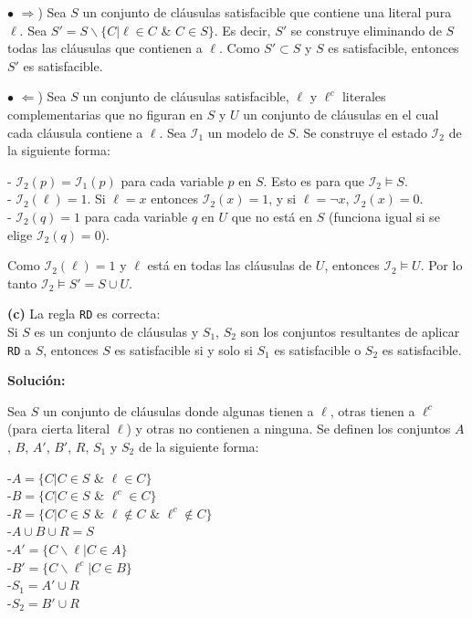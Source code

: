 \documentclass{article}
\begin{document}
\begin{itemize}
$\bullet$ $\Rightarrow$) Sea $S$ un conjunto de cláusulas satisfacible que contiene una literal pura $\ell$. Sea $S' = S \backslash \{ C | \ell \in C$ \& $C \in S \}$. Es decir, $S'$ se construye eliminando de $S$ todas las cláusulas que contienen a $\ell$. Como $S' \subset S$ y $S$ es satisfacible, entonces $S'$ es satisfacible.

$\bullet$ $\Leftarrow$) Sea $S$ un conjunto de cláusulas satisfacible, $\ell$ y $\ell^{c}$ literales complementarias que no figuran en $S$ y $U$ un conjunto de cláusulas en el cual cada cláusula contiene a $\ell$. Sea $\mathcal{I}_1$ un modelo de $S$. Se construye el estado $\mathcal{I}_2$ de la siguiente forma:

- $\mathcal{I}_2 (p) = \mathcal{I}_1 (p)$ para cada variable $p$ en $S$. Esto es para que $\mathcal{I}_2 \models S$.\\
- $\mathcal{I}_2 (\ell) = 1$. Si $\ell = x$ entonces $\mathcal{I}_2 (x) = 1$, y si $\ell = \neg x$, $\mathcal{I}_2(x) = 0$.\\
- $\mathcal{I}_2 (q) = 1$ para cada variable $q$ en $U$ que no está en $S$ (funciona igual si se elige $\mathcal{I}_2 (q) = 0$).

Como $\mathcal{I}_2 (\ell) = 1$ y $\ell$ está en todas las cláusulas de $U$, entonces $\mathcal{I}_2 \models U$. Por lo tanto $\mathcal{I}_2 \models S'=S \cup U$.


\textbf{(c)} La regla \texttt{RD} es correcta:\\Si $S$ es un conjunto de cláusulas y $S_1$, $S_2$ son los conjuntos resultantes de aplicar \texttt{RD} a $S$, entonces $S$ es satisfacible si y solo si $S_1$ es satisfacible o $S_2$ es satisfacible.

\textbf{Solución:}

Sea $S$ un conjunto de cláusulas donde algunas tienen a $\ell$, otras tienen a $\ell^{c}$ (para cierta literal $\ell$) y otras no contienen a ninguna. Se definen los conjuntos $A$, $B$, $A'$, $B'$, $R$, $S_1$ y $S_2$ de la siguiente forma:

-$A = \{ C | C \in S$ \& $\ell \in C \}$\\
-$B = \{ C | C \in S$ \& $\ell^{c} \in C \}$\\
-$R = \{ C | C \in S$ \& $\ell \not \in C$ \& $\ell^{c} \not \in C \}$\\
-$A \cup B \cup R = S$\\
-$A' = \{ C \backslash \ell | C \in A \}$\\
-$B' = \{ C \backslash \ell^{c} | C \in B \}$\\
-$S_1 = A' \cup R$\\
-$S_2 = B' \cup R$


\end{itemize}
\end{document}
